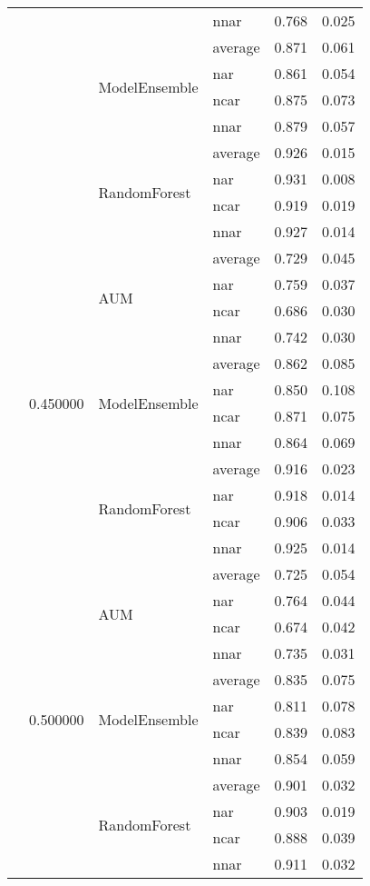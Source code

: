 \begin{longtable}{llllrr}
 &  &  & nnar & 0.768 & 0.025 \\
\cline{3-6}
 &  & \multirow[t]{4}{*}{ModelEnsemble} & average & 0.871 & 0.061 \\
 &  &  & nar & 0.861 & 0.054 \\
 &  &  & ncar & 0.875 & 0.073 \\
 &  &  & nnar & 0.879 & 0.057 \\
\cline{3-6}
 &  & \multirow[t]{4}{*}{RandomForest} & average & 0.926 & 0.015 \\
 &  &  & nar & 0.931 & 0.008 \\
 &  &  & ncar & 0.919 & 0.019 \\
 &  &  & nnar & 0.927 & 0.014 \\
\cline{2-6} \cline{3-6}
 & \multirow[t]{12}{*}{0.450000} & \multirow[t]{4}{*}{AUM} & average & 0.729 & 0.045 \\
 &  &  & nar & 0.759 & 0.037 \\
 &  &  & ncar & 0.686 & 0.030 \\
 &  &  & nnar & 0.742 & 0.030 \\
\cline{3-6}
 &  & \multirow[t]{4}{*}{ModelEnsemble} & average & 0.862 & 0.085 \\
 &  &  & nar & 0.850 & 0.108 \\
 &  &  & ncar & 0.871 & 0.075 \\
 &  &  & nnar & 0.864 & 0.069 \\
\cline{3-6}
 &  & \multirow[t]{4}{*}{RandomForest} & average & 0.916 & 0.023 \\
 &  &  & nar & 0.918 & 0.014 \\
 &  &  & ncar & 0.906 & 0.033 \\
 &  &  & nnar & 0.925 & 0.014 \\
\cline{2-6} \cline{3-6}
 & \multirow[t]{12}{*}{0.500000} & \multirow[t]{4}{*}{AUM} & average & 0.725 & 0.054 \\
 &  &  & nar & 0.764 & 0.044 \\
 &  &  & ncar & 0.674 & 0.042 \\
 &  &  & nnar & 0.735 & 0.031 \\
\cline{3-6}
 &  & \multirow[t]{4}{*}{ModelEnsemble} & average & 0.835 & 0.075 \\
 &  &  & nar & 0.811 & 0.078 \\
 &  &  & ncar & 0.839 & 0.083 \\
 &  &  & nnar & 0.854 & 0.059 \\
\cline{3-6}
 &  & \multirow[t]{4}{*}{RandomForest} & average & 0.901 & 0.032 \\
 &  &  & nar & 0.903 & 0.019 \\
 &  &  & ncar & 0.888 & 0.039 \\
 &  &  & nnar & 0.911 & 0.032 \\
\cline{1-6} \cline{2-6} \cline{3-6}
\bottomrule
\end{longtable}
